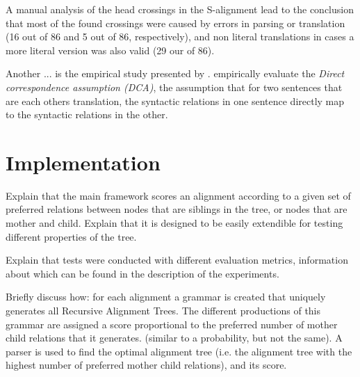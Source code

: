\documentclass{report}
\theoremstyle{definition}
\theoremstyle{plain}
\begin{document}
A manual analysis of the head crossings in the S-alignment lead to the conclusion that most of the found crossings were caused by errors in parsing or translation (16 out of 86 and 5 out of 86, respectively), and non literal translations in cases a more literal version was also valid (29 our of 86).

Another ... is the empirical study presented by \cite{hwa2002evaluating}. \citeauthor{hwa2002evaluating} empirically evaluate the \textit{Direct correspondence assumption (DCA)}, the assumption that for two sentences that are each others translation, the syntactic relations in one sentence directly map to the syntactic relations in the other.



\chapter{Implementation}



Explain that the main framework scores an alignment according to a given set of preferred relations between nodes that are siblings in the tree, or nodes that are mother and child. Explain that it is designed to be easily extendible for testing different properties of the tree.

Explain that tests were conducted with different evaluation metrics, information about which can be found in the description of the experiments.

Briefly discuss how: for each alignment a grammar is created that uniquely generates all Recursive Alignment Trees. The different productions of this grammar are assigned a score proportional to the preferred number of mother child relations that it generates. (similar to a probability, but not the same). A parser is used to find the optimal alignment tree (i.e. the alignment tree with the highest number of preferred mother child relations), and its score.
\end{document}
